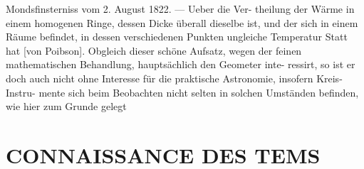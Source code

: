 \documentclass[12pt,a4paper]{article}
\begin{document}
{{{{{{{{Mondsfinsterniss  vom  2.  August  1822.  ---  Ueber  die  Ver- theilung  der  Wärme  in  einem  homogenen  Ringe,  dessen  Dicke  überall  dieselbe  ist,  und  der  sich  in  einem Räume  befindet,  in  dessen  verschiedenen  Punkten  ungleiche  Temperatur  Statt  hat  [von  Poibson].  Obgleich dieser  schöne  Aufsatz,  wegen  der  feinen  mathematischen  Behandlung,  hauptsächlich  den  Geometer  inte- ressirt,  so  ist  er  doch  auch  nicht  ohne  Interesse  für  die  praktische  Astronomie,  insofern  Kreis- Instru- mente sich  beim  Beobachten  nicht  selten  in  solchen  Umständen  befinden,    wie   hier  zum  Grunde  gelegt


\section*{CONNAISSANCE  DES  TEMS}

}}}}}}}}
\end{document}
